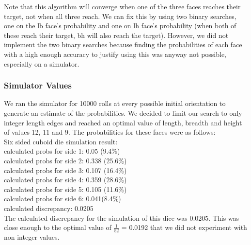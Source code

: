 Note that this algorithm will converge when one of the three faces reaches their target, not when all three reach. We can fix this by using two binary searches, one on the lb face's probability and one on lh face's probability (when both of these reach their target, bh will also reach the target). However, we did not implement the two binary searches because finding the probabilities of each face with a high enough accuracy to justify using this was anyway not possible, especially on a simulator.\\

\subsubsection{Simulator Values}
We ran the simulator for 10000 rolls at every possible initial orientation to generate an estimate of the probabilities. We decided to limit our search to only integer length edges and reached an optimal value of length, breadth and height of values 12, 11 and 9. The probabilities for these faces were as follows:\\
Six sided cuboid die simulation result:\\
calculated probs for side 1: 0.05 (9.4\%)\\
calculated probs for side 2: 0.338 (25.6\%)\\
calculated probs for side 3: 0.107 (16.4\%)\\
calculated probs for side 4: 0.359 (28.6\%)\\
calculated probs for side 5: 0.105 (11.6\%)\\
calculated probs for side 6: 0.041(8.4\%)\\
calculated discrepancy: 0.0205\\
The calculated discrepancy for the simulation of this dice was 0.0205. This was close enough to the optimal value of $\frac{1}{52}$ = 0.0192 that we did not experiment with non integer values.\\

